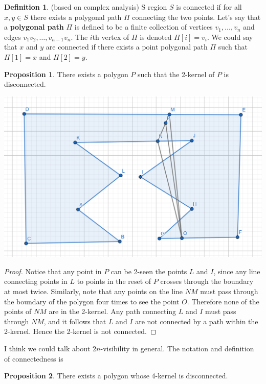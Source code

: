 \documentclass[12pt]{article}
\theoremstyle{definition}
\newtheorem*{definition}{Definition}
\newtheorem{proposition}{Proposition}
\begin{document}
\begin{definition} (based on complex analysis)
S region $S$ is connected if for all $x,y\in S$ there exists a polygonal path $\Pi$ connecting the two points. Let's say that a \textbf{polygonal path} $\Pi$ is defined to be a finite collection of vertices $v_1,\dots,v_n$ and edges $v_1v_2, \dots, v_{n-1}v_n$. The $i$th vertex of $\Pi$ is denoted $ \Pi[i] = v_i$. We could say that $x$ and $y$ are connected if there exists a point polygonal path $\Pi$ such that $\Pi[1] = x $ and $\Pi[2] = y$. 
\end{definition}

\begin{proposition}
There exists a polygon $P$ such that the 2-kernel of $P$ is disconnected.
\end{proposition}
\includegraphics[scale = 0.5]{disconnected.png}


\begin{proof}
Notice that any point in $P$ can be 2-seen the points $L$ and $I$, since any line connecting points in $L$ to points in the reset of $P$ crosses through the boundary at most twice. Similarly, note that any points on the line $NM$ must pass through the boundary of the polygon four times to see the point $O$. Therefore none of the points of $NM$ are in the 2-kernel. Any path connecting $L$ and $I$ must pass through $NM$, and it follows that $L$ and $I$ are not connected by a path within the 2-kernel. Hence the 2-kernel is not connected.
\end{proof}


I think we could talk about $2n$-visibility in general.
The notation and definition of connectedness is 

\begin{proposition}
There exists a polygon whose 4-kernel is disconnected.
\end{proposition}
\end{document}
